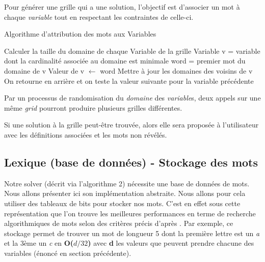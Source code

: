 \documentclass [ 11 pt ] {article}
\begin{document}
    Pour générer une grille qui a une solution, l'objectif est d'associer un mot à chaque \textit{variable} tout en respectant les contraintes de celle-ci.

    \begin{algorithm}[H]
    \caption{Algorithme d'attribution des mots aux Variables}\label{alg:cap}
    \begin{algorithmic}
    \State Calculer la taille du domaine de chaque Variable de la grille
    \State Variable v = variable dont la cardinalité associée au domaine est minimale
    \State word = premier mot du domaine de v
            \State Valeur de v $\gets$ word
            \State Mettre à jour les domaines des voisins de v
           \Else 
                \State On retourne en arrière et on teste la valeur suivante pour la variable précédente
        \EndIf
    \EndWhile
    \end{algorithmic}
    \end{algorithm}
    
    Par un processus de randomisation du \textit{domaine} des \textit{variable}s, deux appels sur une même \textit{grid} pourront produire plusieurs grilles différentes.
    
    Si une solution à la grille peut-être trouvée, alors elle sera proposée à l'utilisateur avec les définitions associées et les mots non révélés.
    

    \subsection{Lexique (base de données) - Stockage des mots}
    
    Notre solver (décrit via l'algorithme 2) nécessite une base de données de mots. Nous allons présenter ici son implémentation abstraite. 
    Nous allons pour cela utiliser des tableaux de bits pour stocker nos mots. C'est en effet sous cette représentation que l'on trouve les meilleures performances en terme de recherche algorithmiques de mots selon des critères précis d'après \cite{Cpc}. Par exemple, ce stockage permet de trouver un mot de longueur 5 dont la première lettre est un \textit{a} et la 3ème un \textit{c} en \textbf{O($d/32$)} avec \textbf{d} les valeurs que peuvent prendre chacune des variables (énoncé en section précédente). \\
    
\end{document}
